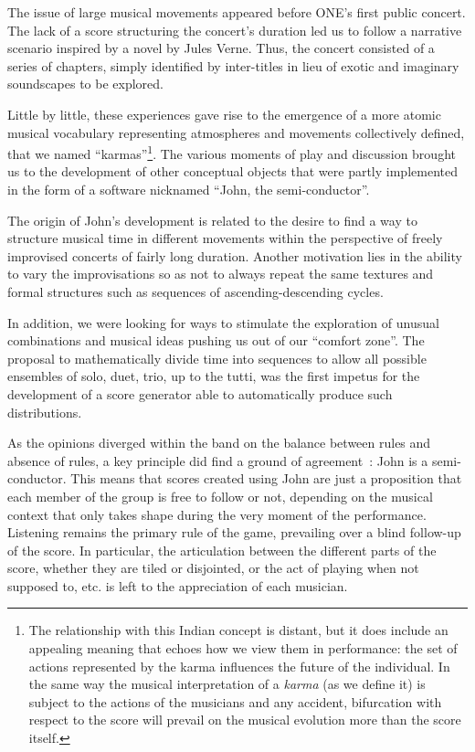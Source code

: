 The issue of large musical movements appeared before ONE's first public concert. The lack of a score structuring the concert's duration led us to follow a narrative scenario inspired by a novel by Jules Verne. Thus, the concert consisted of a series of chapters, simply identified by inter-titles in lieu of exotic and imaginary soundscapes to be explored.

Little by little, these experiences gave rise to the emergence of a more atomic musical vocabulary representing atmospheres and movements collectively defined, that we named “karmas”\footnote{The relationship with this Indian concept is distant, but it does include an appealing meaning that echoes how we view them in performance: the set of actions represented by the karma influences the future of the individual. In the same way the musical interpretation of a \textit{karma} (as we define it) is subject to the actions of the musicians and any accident, bifurcation with respect to the score will prevail on the musical evolution more than the score itself.}. The various moments of play and discussion brought us to the development of other conceptual objects that were partly implemented in the form of a software nicknamed “John, the semi-conductor”.

The origin of John's development is related to the desire to find a way to structure musical time in different movements within the perspective of freely improvised concerts of fairly long duration. Another motivation lies in the ability to vary the improvisations so as not to always repeat the same textures and formal structures such as sequences of ascending-descending cycles.

In addition, we were looking for ways to stimulate the exploration of unusual combinations and musical ideas pushing us out of our “comfort zone”. The proposal to mathematically divide time into sequences to allow all possible ensembles of solo, duet, trio, up to the tutti, was the first impetus for the development of a score generator able to automatically produce such distributions.

As the opinions diverged within the band on the balance between rules and absence of rules, a key principle did find a ground of agreement : John is a semi-conductor. This means that scores created using John are just a proposition that each member of the group is free to follow or not, depending on the musical context that only takes shape during the very moment of the performance. Listening remains the primary rule of the game, prevailing over a blind follow-up of the score. In particular, the articulation between the different parts of the score, whether they are tiled or disjointed, or the act of playing when not supposed to, etc. is left to the appreciation of each musician.

